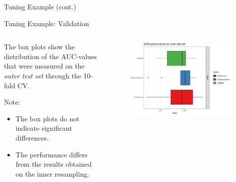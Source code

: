 \begin{frame}{Tuning Example (cont.)}
\end{frame}

\begin{frame}{Tuning Example: Validation}

\begin{columns}
\begin{column}{0.4\textwidth}
  \footnotesize

  The box plots show the distribution of the AUC-values that were measured on the \emph{outer test set} through the 10-fold CV.

  Note:

  \begin{itemize}
    \item The box plots do not indicate significant differences\footnotemark.
    \item The performance differs from the results obtained on the inner resampling.
  \end{itemize}

\end{column}
\begin{column}{0.6\textwidth}
  \vspace{-1em}
  \begin{figure}
  \includegraphics[width=\textwidth]{images/benchmark_boxplot_tuners.png}
  \end{figure}
\end{column}
\end{columns}
\end{frame}

